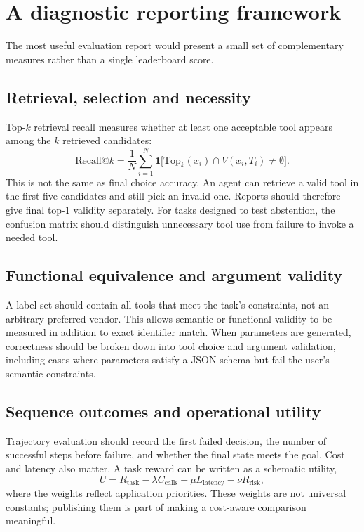 \documentclass[10pt,a4paper]{article}
\begin{document}
\section{A diagnostic reporting framework}
The most useful evaluation report would present a small set of complementary measures rather than a single leaderboard score.

\subsection{Retrieval, selection and necessity}
Top-$k$ retrieval recall measures whether at least one acceptable tool appears among the $k$ retrieved candidates:
\begin{equation}
 \mathrm{Recall@}k=\frac{1}{N}\sum_{i=1}^N\mathbf{1}\big[\mathrm{Top}_k(x_i)\cap V(x_i,T_i)\ne\emptyset\big].
\end{equation}
This is not the same as final choice accuracy. An agent can retrieve a valid tool in the first five candidates and still pick an invalid one. Reports should therefore give final top-1 validity separately. For tasks designed to test abstention, the confusion matrix should distinguish unnecessary tool use from failure to invoke a needed tool.

\subsection{Functional equivalence and argument validity}
A label set should contain all tools that meet the task's constraints, not an arbitrary preferred vendor. This allows semantic or functional validity to be measured in addition to exact identifier match. When parameters are generated, correctness should be broken down into tool choice and argument validation, including cases where parameters satisfy a JSON schema but fail the user's semantic constraints.

\subsection{Sequence outcomes and operational utility}
Trajectory evaluation should record the first failed decision, the number of successful steps before failure, and whether the final state meets the goal. Cost and latency also matter. A task reward can be written as a schematic utility,
\begin{equation}
 U = R_{\mathrm{task}}-\lambda C_{\mathrm{calls}}-\mu L_{\mathrm{latency}}-\nu R_{\mathrm{risk}},
\end{equation}
where the weights reflect application priorities. These weights are not universal constants; publishing them is part of making a cost-aware comparison meaningful.
\end{document}
